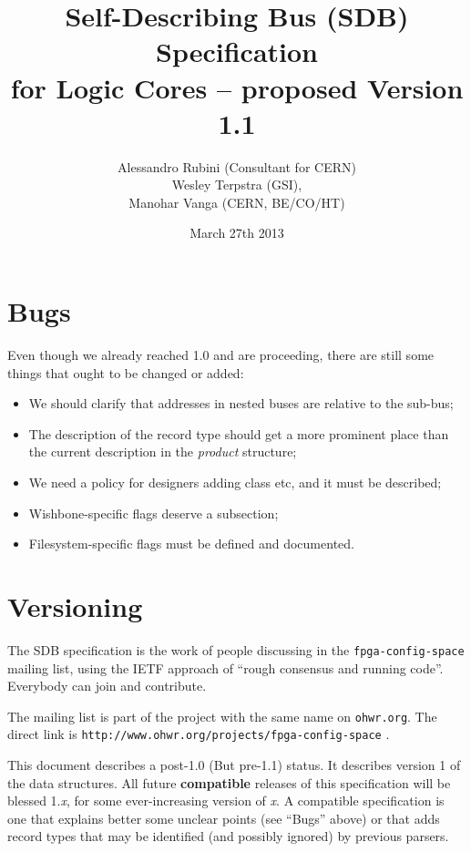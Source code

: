 \documentclass[a4paper, 12pt]{article}
\title{Self-Describing Bus (SDB) Specification\\
for Logic Cores -- proposed Version 1.1}
\author{Alessandro Rubini (Consultant for CERN)\\
Wesley Terpstra (GSI),\\
Manohar Vanga (CERN, BE/CO/HT)}
\date{March 27th 2013}
\begin{document}
\maketitle

\tableofcontents
\listoftables

\pagebreak

\section*{Bugs}

Even though we already reached 1.0 and are proceeding, there are still some
things that ought to be changed or added:

\begin{itemize}
\item We should clarify that  addresses in nested buses are relative to the sub-bus;
\item The description of the record type should get a more prominent place than the
  current description in the \textit{product} structure;
\item We need a policy for designers adding class etc, and it must be described;
\item Wishbone-specific flags deserve a subsection;
\item Filesystem-specific flags must be defined and documented.
\end{itemize}

\section*{Versioning}

The SDB specification is the work of people discussing in the
\texttt{fpga-config-space} mailing list, using the IETF approach of
``rough consensus and running code''. Everybody can join and contribute.

The mailing list is part of the project
with the same name on \texttt{ohwr.org}. The direct
link is \texttt{http://www.ohwr.org/projects/fpga-config-space} .

This document describes a post-1.0 (But pre-1.1) status. It describes version 1 of the data
structures. All future \textbf{compatible} releases of this
specification will be blessed 1.\textit{x}, for some ever-increasing
version of \textit{x}.  A compatible specification is one that
explains better some unclear points (see ``Bugs'' above) or that adds
record types that may be identified (and possibly ignored) by previous
parsers.
\end{document}
